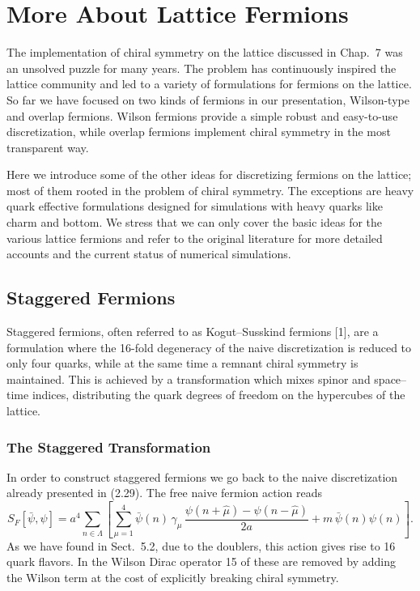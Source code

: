 
\chapter{More About Lattice Fermions}

The implementation of chiral symmetry on the lattice discussed in Chap.~7
was an unsolved puzzle for many years. The problem has continuously inspired
the lattice community and led to a variety of formulations for fermions on
the lattice. So far we have focused on two kinds of fermions in our
presentation, Wilson-type and overlap fermions. Wilson fermions provide a
simple robust and easy-to-use discretization, while overlap fermions
implement chiral symmetry in the most transparent way.

Here we introduce some of the other ideas for discretizing fermions on the
lattice; most of them rooted in the problem of chiral symmetry. The
exceptions are heavy quark effective formulations designed for simulations
with heavy quarks like charm and bottom. We stress that we can only cover the
basic ideas for the various lattice fermions and refer to the original
literature for more detailed accounts and the current status of numerical
simulations.

\section{Staggered Fermions}

Staggered fermions, often referred to as Kogut--Susskind fermions [1], are a
formulation where the 16-fold degeneracy of the naive discretization is
reduced to only four quarks, while at the same time a remnant chiral symmetry
is maintained. This is achieved by a transformation which mixes spinor and
space--time indices, distributing the quark degrees of freedom on the
hypercubes of the lattice.

\subsection{The Staggered Transformation}

In order to construct staggered fermions we go back to the naive
discretization already presented in (2.29). The free naive fermion action
reads
\begin{equation}
  S_F[\bar\psi, \psi] = a^4 \sum_{n\in\Lambda}
  \left[
    \sum_{\mu=1}^{4} \bar\psi(n)\, \gamma_\mu \,
    \frac{\psi(n+\hat\mu) - \psi(n-\hat\mu)}{2a}
    + m\,\bar\psi(n)\psi(n)
  \right] .
\end{equation}
As we have found in Sect.~5.2, due to the doublers, this action gives rise to
16 quark flavors. In the Wilson Dirac operator 15 of these are removed by
adding the Wilson term at the cost of explicitly breaking chiral symmetry.


